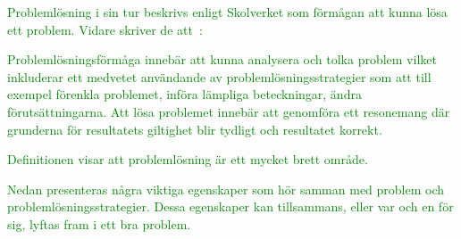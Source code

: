 \textcolor{green}{Problemlösning i sin tur beskrivs enligt Skolverket som förmågan att kunna lösa ett problem. Vidare skriver de att~\cite{ProblemDef}:}



\begin{displayquote}
\textcolor{green}{Problemlösningsförmåga innebär att kunna analysera och tolka problem vilket inkluderar ett medvetet användande av problemlösningsstrategier som att till exempel förenkla problemet, införa lämpliga beteckningar, ändra förutsättningarna. Att lösa problemet innebär att genomföra ett resonemang där grunderna för resultatets giltighet blir tydligt och resultatet korrekt.}
\end{displayquote}

\noindent \textcolor{green}{
Definitionen visar att problemlösning är ett mycket brett område.}

\textcolor{green}{Nedan presenteras några viktiga egenskaper som hör samman med problem och problemlösningsstrategier. Dessa egenskaper kan tillsammans, eller var och en för sig, lyftas fram i ett bra problem.}

